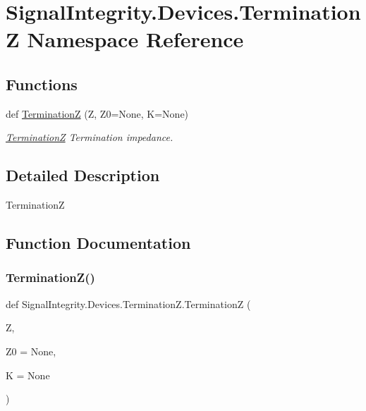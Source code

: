 \hypertarget{namespaceSignalIntegrity_1_1Devices_1_1TerminationZ}{}\section{Signal\+Integrity.\+Devices.\+TerminationZ Namespace Reference}
\label{namespaceSignalIntegrity_1_1Devices_1_1TerminationZ}
\subsection*{Functions}
\begin{DoxyCompactItemize}
\item 
def \hyperlink{namespaceSignalIntegrity_1_1Devices_1_1TerminationZ_ad2e7db90d88ac11a703080a4a68caf5c}{TerminationZ} (Z, Z0=None, K=None)
\begin{DoxyCompactList}\small\item\em \hyperlink{namespaceSignalIntegrity_1_1Devices_1_1TerminationZ}{TerminationZ} Termination impedance. \end{DoxyCompactList}\end{DoxyCompactItemize}


\subsection{Detailed Description}
\begin{DoxyVerb}TerminationZ\end{DoxyVerb}
 

\subsection{Function Documentation}
\mbox{\label{namespaceSignalIntegrity_1_1Devices_1_1TerminationZ_ad2e7db90d88ac11a703080a4a68caf5c}} 
\subsubsection{\texorpdfstring{Termination\+Z()}{TerminationZ()}}
{\footnotesize\ttfamily def Signal\+Integrity.\+Devices.\+Termination\+Z.\+TerminationZ (\begin{DoxyParamCaption}\item[{}]{Z,  }\item[{}]{Z0 = {\ttfamily None},  }\item[{}]{K = {\ttfamily None} }\end{DoxyParamCaption})}



